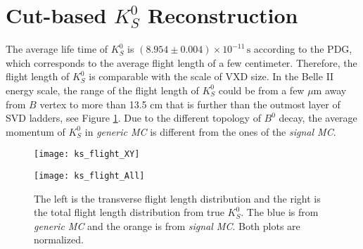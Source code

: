  \section{Cut-based $K_S^0$ Reconstruction}
 The average life time of $K_S^0$ is $(8.954 \pm 0.004) \times 10 ^{-11} \, \text{s}$ according to the PDG, which corresponds to the average flight length of a few centimeter. Therefore, the flight length of $K_S^0$ is comparable with the scale of VXD size. In the Belle II energy scale, the range of the flight length of $K_S^0$ could be from a few $\mu$m away from $B$ vertex to more than 13.5 cm that is further than the outmost layer of SVD ladders, see Figure \ref{fig:ks_flight}.  Due to the different topology of $B^0$ decay, the average momentum of $K_S^0$ in \textit{generic MC} is different from the ones of the \textit{signal MC}.
 \begin{figure}[htpb]
 	\centering 
 	\begin{minipage}[b]{0.49\linewidth}
 	\texttt{[image: ks\_flight\_XY]}
 	\end{minipage}
	\begin{minipage}[b]{0.49\linewidth}
		\texttt{[image: ks\_flight\_All]}
	\end{minipage}
 	\caption{The left is the transverse flight length distribution and the right is the total flight length distribution from true $K_S^0$.  The blue is from \textit{generic MC} and  the orange is from \textit{signal MC}. Both plots are normalized.}
 	\label{fig:ks_flight}
 \end{figure}

